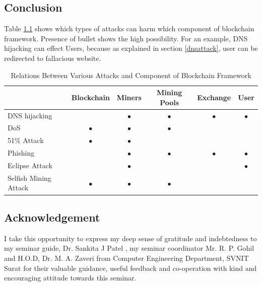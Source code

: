 \documentclass[a4paper,twoside,12pt]{report}
\begin{document}
\begin{spacing}{1.5}
\chapter{Conclusion}
Table \ref{tab:relationattackancomponent} shows which types of attacks can harm which component of blockchain framework. Presence of bullet shows the high possibility. For an example, DNS hijacking can effect Users, because as explained in section \ref{dnsattack}, user can be redirected to fallacious website.   
\label{chaper4}
\begin{table}[h!]
  \begin{center}
    \caption{\fontsize{10}{10}\selectfont Relations Between Various Attacks and Component of Blockchain Framework}
    \label{tab:relationattackancomponent}
    \begin{tabular}{l|c|c|c|c|c} %
      \toprule
      \textbf{} & \textbf{Blockchain} & \textbf{Miners} & \textbf{Mining Pools} &\textbf{Exchange} &\textbf{User}\\
		\hline
      DNS hijacking         &         &$\bullet$&$\bullet$&$\bullet$&$\bullet$\\
		\hline      
      DoS                   &$\bullet$&$\bullet$&$\bullet$&         &\\
		\hline      
      51\% Attack           &$\bullet$&$\bullet$&         &         &\\
		\hline      
      Phishing              &         &$\bullet$&$\bullet$&$\bullet$&$\bullet$\\
		\hline
	  Eclipse Attack        &         &$\bullet$&         &         &$\bullet$\\
      \hline
	  Selfish Mining Attack &$\bullet$&$\bullet$&$\bullet$&         &\\
      \bottomrule
    \end{tabular}
  \end{center}
\end{table}

\end{spacing}


\begin{spacing}{1.5}
\chapter*{Acknowledgement}
I take this opportunity to express my deep sense of gratitude and indebtedness to my seminar guide, Dr. Sankita J Patel , my seminar coordinator Mr. R. P. Gohil and H.O.D, Dr. M. A. Zaveri from Computer Engineering Department, SVNIT Surat for their valuable guidance, useful feedback and co-operation with kind and encouraging attitude towards this seminar.
\end{spacing}
\end{document}
